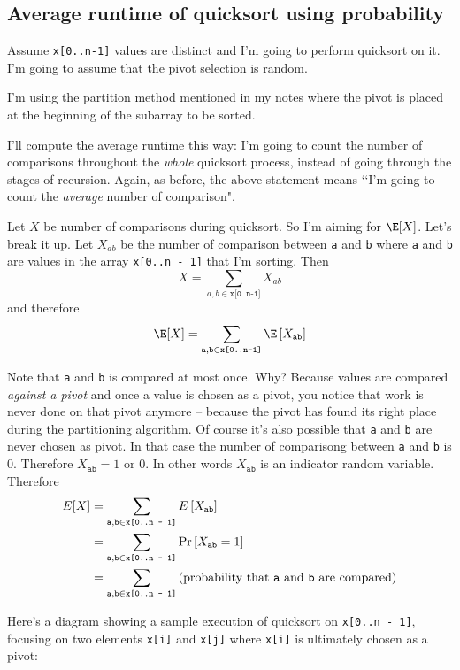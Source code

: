 \subsection{Average runtime of quicksort using probability}

Assume \verb!x[0..n-1]! values are distinct and I'm going to
perform quicksort on it.
I'm going to assume that the pivot selection is random.

I'm using the partition method mentioned in my notes
where the pivot is placed at the beginning of the
subarray to be sorted.

I'll compute the average runtime this way:
I'm going to count the number of comparisons throughout the \textit{whole} quicksort process,
instead of going through the
stages of recursion.
Again, as before, the above statement means \lq\lq I'm going to count
the \textit{average} number of comparison".

Let $X$ be number of comparisons during quicksort.
So I'm aiming for $\E[X]$.
Let's break it up.
Let $X_{ab}$ be the number of comparison between \verb!a! and \verb!b!
where \verb!a! and \verb!b! are values in the array \verb!x[0..n - 1]!
that I'm sorting.
Then
\[
  X =
  \sum_{a,b \in \texttt{x[0..n-1]}} X_{ab}  
\]
and therefore
\[
  \E[X] =
  \sum_{\texttt{a},\texttt{b} \in \texttt{x[0..n-1]}} \E \left[ X_{\texttt{ab}} \right]  
\]


Note that \verb!a! and \verb!b! is compared at most once.
Why?
Because values are compared \textit{against a pivot} and once a value is
chosen as a pivot, you notice that work is never done on that pivot anymore -- because
the pivot has found its right place during the partitioning algorithm.
Of course it's also possible that \verb!a! and \verb!b! are never chosen as pivot.
In that case the number of comparisong between \verb!a! and \verb!b! is 0.
Therefore
$X_{\texttt{ab}} = 1$ or $0$.
In other words $X_{\texttt{ab}}$ is an indicator random variable.
Therefore
\begin{align*}
  E[X]
  &= \sum_{\texttt{a},\texttt{b} \in \texttt{x[0..n - 1]}} E \left[ X_{\texttt{ab}} \right]
    \\
  &= \sum_{\texttt{a},\texttt{b} \in \texttt{x[0..n - 1]}} \Pr \left[ X_{\texttt{ab}} = 1 \right]
    \\
  &= \sum_{\texttt{a},\texttt{b} \in \texttt{x[0..n - 1]}}
    \text{(probability that \texttt{a} and \texttt{b} are compared)}
\end{align*}

Here's a diagram showing a sample execution of quicksort on \verb!x[0..n - 1]!, focusing on
two elements \verb!x[i]! and \verb!x[j]! where \verb!x[i]! is ultimately
chosen as a pivot:

